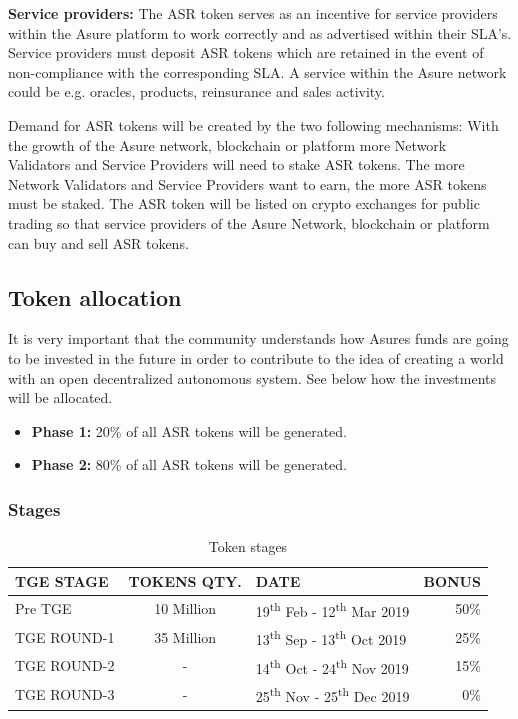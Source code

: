 \textbf{Service providers:}
The ASR token serves as an incentive for service providers within the Asure platform to work correctly and as advertised within their SLA’s. Service providers must deposit ASR tokens which are retained in the event of non-compliance with the corresponding SLA. A service within the Asure network could be e.g. oracles, products, reinsurance and sales activity.\newline

Demand for ASR tokens will be created by the two following mechanisms: With the growth of the Asure network, blockchain or platform more Network Validators and Service Providers will need to stake ASR tokens. The more Network Validators and Service Providers want to earn, the more ASR tokens must be staked.\newline
The ASR token will be listed on crypto exchanges for public trading so that service providers of the Asure Network, blockchain or platform can buy and sell ASR tokens.
\newline\newline



\subsection{Token allocation}

It is very important that the community understands how Asures funds are going to be invested in the future in order to contribute to the idea of creating a world with an open decentralized autonomous system. See below how the investments will be allocated. 

\begin{itemize}
\item \textbf{Phase 1:} 20\% of all ASR tokens will be generated.
\item \textbf{Phase 2:} 80\% of all ASR tokens will be generated.
\end{itemize}


\subsubsection{Stages}

\begin{table}[H]
\begin{tabular}{lcp{}r}
  TGE STAGE & TOKENS QTY. & DATE & BONUS\\\hline
  Pre TGE & 10 Million & 19\textsuperscript{th} Feb - 12\textsuperscript{th} Mar 2019 & 50\%\\
  TGE ROUND-1 &	35 Million & 13\textsuperscript{th} Sep - 13\textsuperscript{th} Oct 2019 & 25\%\\
  TGE ROUND-2 &	- & 14\textsuperscript{th} Oct - 24\textsuperscript{th} Nov 2019 & 15\%\\
  TGE ROUND-3 &	- & 25\textsuperscript{th} Nov - 25\textsuperscript{th} Dec 2019 & 0\% \\

\end{tabular}
\caption{\label{tab:table-name}Token stages}
\end{table}


